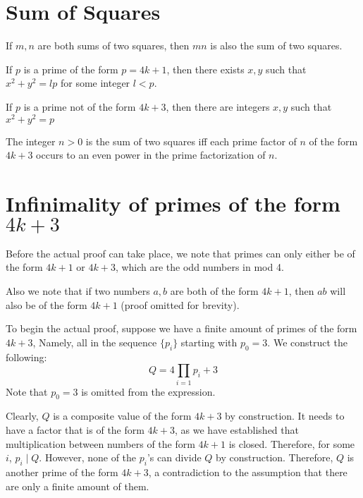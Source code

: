\documentclass{article}
\begin{document}
\begin{multicols*}{2}
\section{Sum of Squares}

If $m,n$ are both sums of two squares, then $mn$ is also the sum of two squares.

If $p$ is a prime of the form $p = 4k + 1$, then there exists $x,y$ such that $x^2 + y^2 = lp$ for some integer $l < p$.

If $p$ is a prime not of the form $4k + 3$, then there are integers $x, y$ such that $x^2 + y^2 = p$

The integer $n > 0$ is the sum of two squares iff each prime factor of $n$ of the form $4k +3$ occurs to an even power in the prime factorization of $n$.

\newpage

\section{Infinimality of primes of the form $4k+3$}

Before the actual proof can take place, we note that primes can only either be of the form $4k+1$ or $4k+3$, which are the odd numbers in mod 4.

Also we note that if two numbers $a, b$ are both of the form $4k +1$, then $ab$ will also be of the form $4k + 1$ (proof omitted for brevity).

To begin the actual proof, suppose we have a finite amount of primes of the form $4k+3$, Namely, all in the sequence $\{p_i\}$ starting with $p_0 = 3$. We construct the following: \[Q = 4\prod_{i=1}{p_i} + 3\]Note that $p_0 = 3$ is omitted from the expression.

Clearly, $Q$ is a composite value of the form $4k+3$ by construction. It needs to have a factor that is of the form $4k+3$, as we have established that multiplication between numbers of the form $4k+1$ is closed. Therefore, for some $i$, $p_i \mid Q$. However, none of the $p_i$'s can divide $Q$ by construction. Therefore, $Q$ is another prime of the form $4k+3$, a contradiction to the assumption that there are only a finite amount of them.

\end{multicols*}
\end{document}
